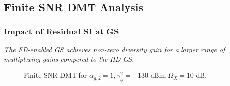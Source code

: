 \subsection{Finite SNR DMT Analysis}

\subsubsection{Impact of Residual SI at GS}

\begin{observation}
\emph{\emph{The FD-enabled GS achieves non-zero diversity gain for a larger range of multiplexing gains compared to the HD GS.}
}\end{observation}

\begin{figure}[]
\centering
{}
\hfil
{}
\caption{Finite SNR DMT for $\alpha_{g,2}=1, \gamma_{\phi}^2=-130 \text{ dBm}, \Omega_X=10 \text{ dB}$.}
\label{interference_management_HBD_ACS_fig_sim}
\end{figure}

